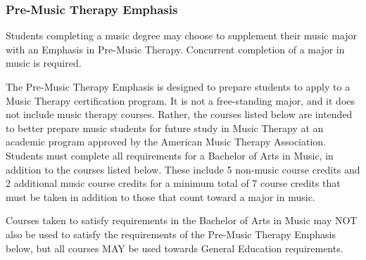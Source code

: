 \documentclass[
  letterpaper,
]{scrbook}
\begin{document}
\subsubsection{Pre-Music Therapy
Emphasis}\label{pre-music-therapy-emphasis}

Students completing a music degree may choose to supplement their music
major with an Emphasis in Pre-Music Therapy. Concurrent completion of a
major in music is required.

The Pre-Music Therapy Emphasis is designed to prepare students to apply
to a Music Therapy certification program. It is not a free-standing
major, and it does not include music therapy courses. Rather, the
courses listed below are intended to better prepare music students for
future study in Music Therapy at an academic program approved by the
American Music Therapy Association. Students must complete all
requirements for a Bachelor of Arts in Music, in addition to the courses
listed below. These include 5 non-music course credits and 2 additional
music course credits for a minimum total of 7 course credits that must
be taken in addition to those that count toward a major in music.

Courses taken to satisfy requirements in the Bachelor of Arts in Music
may NOT also be used to satisfy the requirements of the Pre-Music
Therapy Emphasis below, but all courses MAY be used towards General
Education requirements.
\end{document}
